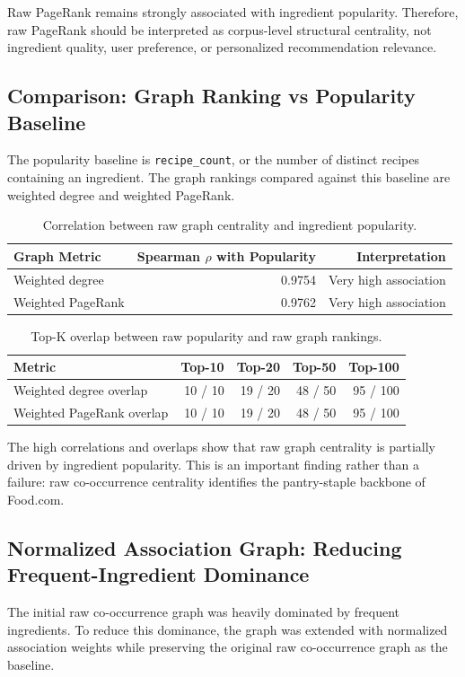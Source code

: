 \documentclass[11pt,a4paper]{article}
\begin{document}
Raw PageRank remains strongly associated with ingredient popularity. Therefore, raw PageRank should be interpreted as corpus-level structural centrality, not ingredient quality, user preference, or personalized recommendation relevance.

\subsection{Comparison: Graph Ranking vs Popularity Baseline}
The popularity baseline is \texttt{recipe\_count}, or the number of distinct recipes containing an ingredient. The graph rankings compared against this baseline are weighted degree and weighted PageRank.

\begin{table}[H]
\centering
\small
\begin{tabular}{lrr}
\toprule
\textbf{Graph Metric} & \textbf{Spearman $\rho$ with Popularity} & \textbf{Interpretation} \\
\midrule
Weighted degree & 0.9754 & Very high association \\
Weighted PageRank & 0.9762 & Very high association \\
\bottomrule
\end{tabular}
\caption{Correlation between raw graph centrality and ingredient popularity.}
\label{tab:graph_popularity_correlation}
\end{table}

\begin{table}[H]
\centering
\small
\begin{tabular}{lrrrr}
\toprule
\textbf{Metric} & \textbf{Top-10} & \textbf{Top-20} & \textbf{Top-50} & \textbf{Top-100} \\
\midrule
Weighted degree overlap & 10 / 10 & 19 / 20 & 48 / 50 & 95 / 100 \\
Weighted PageRank overlap & 10 / 10 & 19 / 20 & 48 / 50 & 95 / 100 \\
\bottomrule
\end{tabular}
\caption{Top-K overlap between raw popularity and raw graph rankings.}
\label{tab:graph_popularity_overlap}
\end{table}

The high correlations and overlaps show that raw graph centrality is partially driven by ingredient popularity. This is an important finding rather than a failure: raw co-occurrence centrality identifies the pantry-staple backbone of Food.com.

\subsection{Normalized Association Graph: Reducing Frequent-Ingredient Dominance}
The initial raw co-occurrence graph was heavily dominated by frequent ingredients. To reduce this dominance, the graph was extended with normalized association weights while preserving the original raw co-occurrence graph as the baseline.
\end{document}

